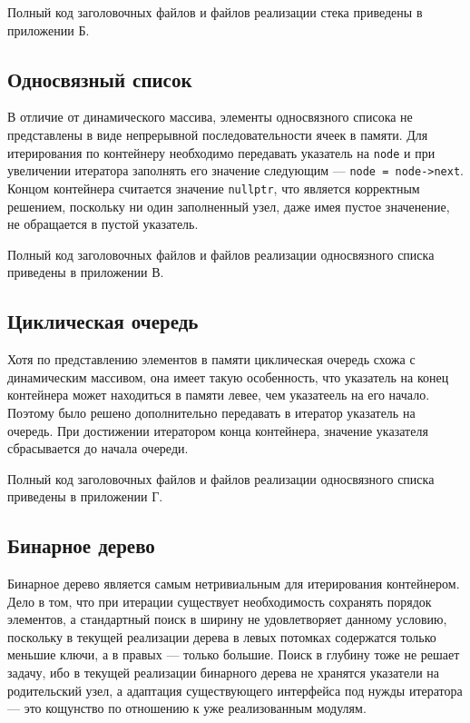 \documentclass[a4paper,12pt]{article}
\begin{document}
Полный код заголовочных файлов и файлов реализации стека приведены в приложении Б.

\cleardoublepage

\subsection{Односвязный список}

В отличие от динамического массива, элементы односвязного списока не представлены в виде непрерывной последовательности ячеек в памяти.
Для итерирования по контейнеру необходимо передавать указатель на \verb!node! и при увеличении итератора заполнять его значение следующим — \verb!node = node->next!. Концом контейнера считается значение \verb!nullptr!, что является корректным решением, поскольку ни один заполненный узел, даже имея пустое значенение, не обращается в пустой указатель.

Полный код заголовочных файлов и файлов реализации односвязного списка приведены в приложении В.

\cleardoublepage

\subsection{Циклическая очередь}

Хотя по представлению элементов в памяти циклическая очередь схожа с динамическим массивом, она имеет такую особенность, что указатель на конец контейнера может находиться в памяти левее, чем указатеель на его начало.
Поэтому было решено дополнительно передавать в итератор указатель на очередь. При достижении итератором конца контейнера, значение указателя сбрасывается до начала очереди.

Полный код заголовочных файлов и файлов реализации односвязного списка приведены в приложении Г.

\cleardoublepage

\subsection{Бинарное дерево}

Бинарное дерево является самым нетривиальным для итерирования контейнером.
Дело в том, что при итерации существует необходимость сохранять порядок элементов, а стандартный поиск в ширину не удовлетворяет данному условию, поскольку в текущей реализации дерева в левых потомках содержатся только меньшие ключи, а в правых — только большие.
Поиск в глубину тоже не решает задачу, ибо в текущей реализации бинарного дерева не хранятся указатели на родительский узел, а адаптация существующего интерфейса под нужды итератора — это кощунство по отношению к уже реализованным модулям.
\end{document}
